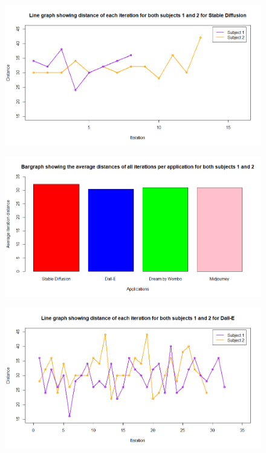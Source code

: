 \documentclass[]{report}
\begin{document}
    
	\begin{figure}
		\centering
		\includegraphics[width=1\linewidth]{LineGraphStableDiff}
		\caption{}
		\label{fig:linegraphstablediff}
	\end{figure}

\begin{figure}
	\centering
	\includegraphics[width=1\linewidth]{Bargraph}
	\caption{}
	\label{fig:bargraph}
\end{figure}

	\begin{figure}
		\centering
		\includegraphics[width=1\linewidth]{LineGraphDall-E}
		\caption{}
		\label{fig:linegraphdall-e}
	\end{figure}
\end{document}
